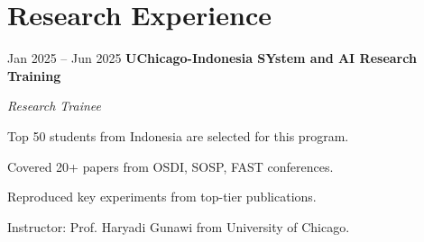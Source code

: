\section{Research Experience}

\begin{twocolentry}{
    Jan 2025 – Jun 2025
}
\textbf{UChicago-Indonesia SYstem and AI Research Training}\end{twocolentry}
\textit{Research Trainee}

\vspace{0.10 cm}
\begin{onecolentry}
    \begin{highlights}
        \item Top 50 students from Indonesia are selected for this program.
        \item Covered 20+ papers from OSDI, SOSP, FAST conferences.
        \item Reproduced key experiments from top-tier publications.
        \item Instructor: Prof. Haryadi Gunawi from University of Chicago.
    \end{highlights}
\end{onecolentry}
